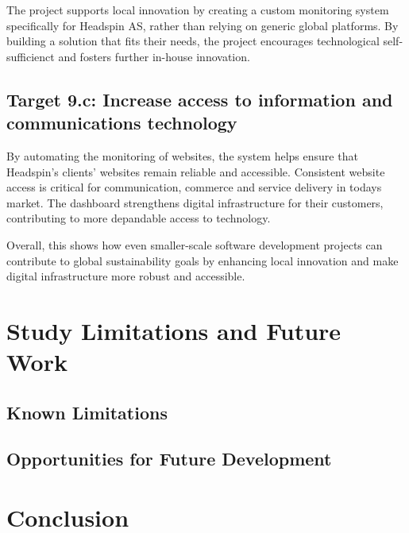 The project supports local innovation by creating a custom monitoring system specifically for Headspin AS, rather than relying on generic global platforms. By building a solution that fits their needs, the project encourages technological self-sufficienct and fosters further in-house innovation. 


\subsection{Target 9.c: Increase access to information and communications technology}

By automating the monitoring of websites, the system helps ensure that Headspin's clients' websites remain reliable and accessible. Consistent website access is critical for communication, commerce and service delivery in todays market. The dashboard strengthens digital infrastructure for their customers, contributing to more depandable access to technology. 

Overall, this shows how even smaller-scale software development projects can contribute to global sustainability goals by enhancing local innovation and make digital infrastructure more robust and accessible.


\section{Study Limitations and Future Work}
\label{sec:limitations_and_future}

\subsection{Known Limitations}


\subsection{Opportunities for Future Development}


\section{Conclusion}
\label{sec:discussion_conclusion}

